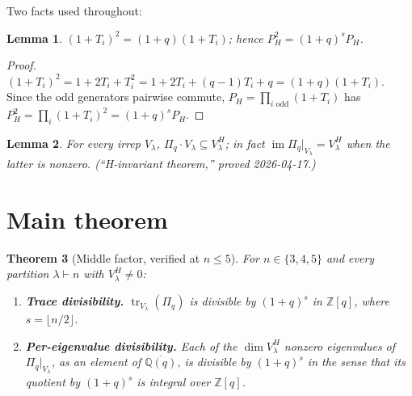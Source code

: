 \documentclass[11pt]{article}
\newtheorem{theorem}{Theorem}
\newtheorem{lemma}[theorem]{Lemma}
\theoremstyle{definition}
\newcommand{\Pq}{\Pi_q}
\newcommand{\PH}{P_H}
\newcommand{\Z}{\mathbb{Z}}
\newcommand{\Q}{\mathbb{Q}}
\newcommand{\tr}{\operatorname{tr}}
\begin{document}
\medskip

Two facts used throughout:

\begin{lemma}\label{lem:idempotency}
$(1+T_i)^2=(1+q)(1+T_i)$; hence $\PH^2=(1+q)^s \PH$.
\end{lemma}

\begin{proof}
$(1+T_i)^2=1+2T_i+T_i^2=1+2T_i+(q-1)T_i+q=(1+q)(1+T_i)$. Since the odd
generators pairwise commute, $\PH=\prod_{i\text{ odd}}(1+T_i)$ has
$\PH^2=\prod_i(1+T_i)^2=(1+q)^s\PH$.
\end{proof}

\begin{lemma}\label{lem:Hinv}
For every irrep $V_\lambda$, $\Pq\cdot V_\lambda\subseteq V_\lambda^H$; in
fact $\operatorname{im}\Pq|_{V_\lambda}=V_\lambda^H$ when the latter is
nonzero. (``H-invariant theorem,'' proved 2026-04-17.)
\end{lemma}

\section{Main theorem}

\begin{theorem}[Middle factor, verified at $n\le 5$]\label{thm:main}
For $n\in\{3,4,5\}$ and every partition $\lambda\vdash n$ with
$V_\lambda^H\ne 0$:
\begin{enumerate}
\item[(a)] \textbf{Trace divisibility.}
  $\tr_{V_\lambda}(\Pq)$ is divisible by $(1+q)^s$ in $\Z[q]$, where
  $s=\lfloor n/2\rfloor$.
\item[(b)] \textbf{Per-eigenvalue divisibility.}
  Each of the $\dim V_\lambda^H$ nonzero eigenvalues of $\Pq|_{V_\lambda}$,
  as an element of $\overline{\Q(q)}$, is divisible by $(1+q)^s$ in the
  sense that its quotient by $(1+q)^s$ is integral over $\Z[q]$.
\end{enumerate}
\end{theorem}
\end{document}
